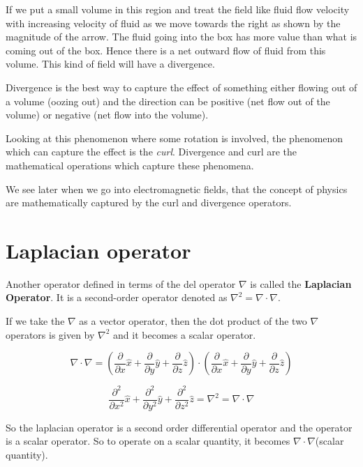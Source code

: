 If we put a small volume in this region and treat the field like fluid flow velocity with increasing velocity of fluid as we move towards the right as shown by the magnitude of the arrow. The fluid going into the box has more value than what is coming out of the box. Hence there is a net outward flow of fluid from this volume. This kind of field will have a divergence.

Divergence is the best way to capture the effect of something either flowing out of a volume (oozing out) and the direction can be positive (net flow out of the volume) or negative (net flow into the volume).

Looking at this phenomenon where some rotation is involved, the phenomenon which can capture the effect is the \textit{curl}. Divergence and curl are the mathematical operations which capture these phenomena.

We see later when we go into electromagnetic fields, that the concept of physics are mathematically captured by the curl and divergence operators.

\section{Laplacian operator}
Another operator defined in terms of the del operator $\nabla$ is called the \textbf{Laplacian Operator}. It is a second-order operator denoted as $\nabla^2 = \nabla \cdot \nabla$.

If we take the $\nabla$ as a vector operator, then the dot product of the two $\nabla$ operators is given by $\nabla^2$ and it becomes a scalar operator.

\begin{dmath}
\nabla \cdot \nabla =  \left(\frac{\partial  }{\partial x}\hat x + \frac{\partial  }{\partial y}\hat y + \frac{\partial  }{\partial z}\hat z \right) \cdot \left( \frac{\partial  }{\partial x}\hat x + \frac{\partial  }{\partial y}\hat y + \frac{\partial  }{\partial z}\hat z\right)
\end{dmath}

\begin{dmath}
\frac{\partial^{2}  }{\partial x^{2}}\hat x + \frac{\partial^{2}  }{\partial y^{2}}\hat y + \frac{\partial^{2}  }{\partial z^{2}}\hat z = \nabla^{2} = \nabla \cdot \nabla
\end{dmath}

So the laplacian operator is a second order differential operator and the operator is a scalar operator. So to operate on a scalar quantity, it becomes $\nabla\cdot\nabla$(scalar quantity).\newline


